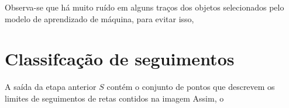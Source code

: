 \documentclass[12pt]{article}
\begin{document}
Observa-se que há muito ruído em alguns traços dos objetos selecionados pelo modelo de aprendizado de máquina, para evitar isso, 


\section{Classifcação de seguimentos}

A saída da etapa anterior $S$ contém o conjunto de pontos que descrevem os limites de seguimentos de retas contidos na imagem
Assim, o 










\end{document}
